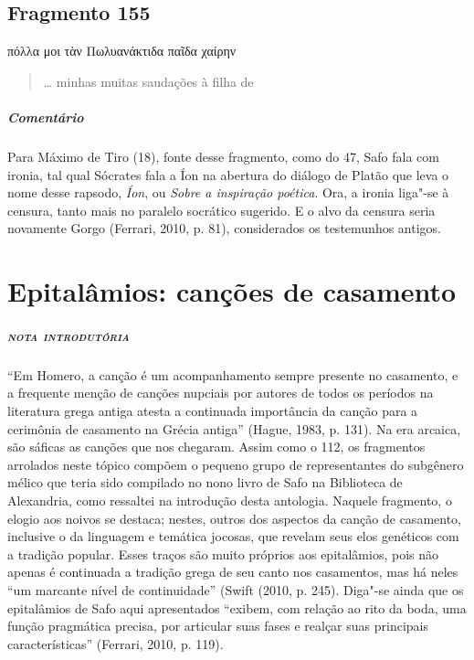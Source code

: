 {\section{Fragmento 155}

\begin{gkverse}
πόλλα μοι τὰν Πωλυανάκτιδα παῖδα χαίρην
\end{gkverse}

\begin{verse}
\ldots{} minhas muitas saudações à filha de 
\end{verse}

{\paragraph{Comentário} Para Máximo de Tiro (18), fonte desse fragmento, como do 47, Safo fala com ironia, tal qual
Sócrates fala a Íon na abertura do diálogo de Platão que leva o nome desse
rapsodo, \textit{Íon}, ou \textit{Sobre a inspiração poética}. Ora, a ironia
liga"-se à censura, tanto mais no paralelo socrático sugerido.
E o alvo da censura seria novamente Gorgo (Ferrari, 2010, p. 81), considerados os testemunhos antigos.}



\chapter[Epitalâmios: canções de casamento]{Epitalâmios: canções de casamento}

\paragraph{\textsc{nota introdutória}}
``Em Homero, a canção é um acompanhamento sempre presente no casamento, e a frequente menção de canções nupciais por autores de todos os períodos na literatura grega antiga atesta a continuada importância da canção para a cerimônia de casamento na Grécia antiga” (Hague, 1983, p. 131). Na era arcaica, são sáficas as canções que nos chegaram. Assim como o 112, os fragmentos arrolados neste tópico compõem o pequeno grupo
de representantes do subgênero mélico que teria sido compilado no nono livro de
Safo na Biblioteca de Alexandria, como ressaltei na introdução desta antologia.
Naquele fragmento, o elogio aos noivos se destaca; nestes, outros dos aspectos
da canção de casamento, inclusive o da linguagem e temática jocosas, que
revelam seus elos genéticos com a tradição popular.
Esses traços são muito próprios aos epitalâmios, pois não apenas é continuada a tradição grega de seu canto nos casamentos, mas há neles  “um marcante nível de continuidade” (Swift (2010, p. 245). Diga"-se ainda que os epitalâmios de Safo aqui apresentados “exibem, com relação ao rito da boda, uma função pragmática precisa, por articular suas fases e realçar suas principais características” (Ferrari, 2010, p. 119). 

}

